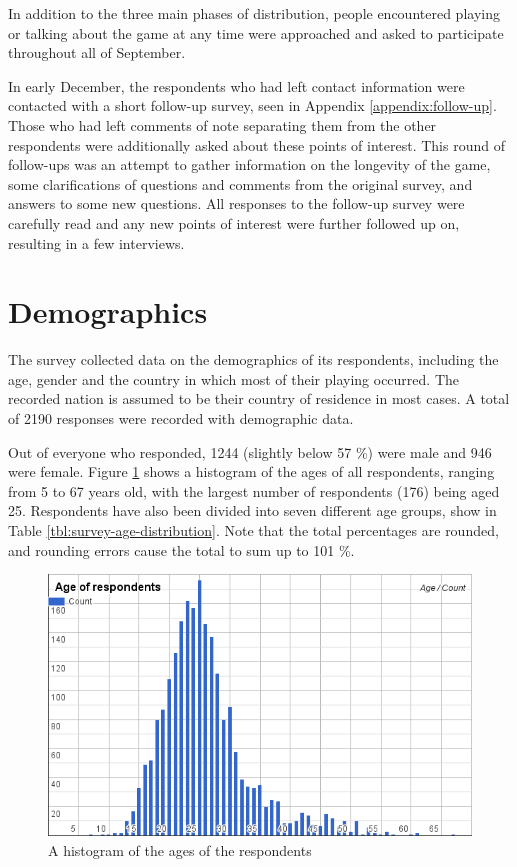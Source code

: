 In addition to the three main phases of distribution, people encountered playing or talking about the game at any time were approached and asked to participate throughout all of September.

In early December, the respondents who had left contact information were contacted with a short follow-up survey, seen in Appendix \ref{appendix:follow-up}. Those who had left comments of note separating them from the other respondents were additionally asked about these points of interest. This round of follow-ups was an attempt to gather information on the longevity of the game, some clarifications of questions and comments from the original survey, and answers to some new questions. All responses to the follow-up survey were carefully read and any new points of interest were further followed up on, resulting in a few interviews.

\section{Demographics}
\label{sec:player-study-demographics}

The survey collected data on the demographics of its respondents, including the age, gender and the country in which most of their playing occurred. The recorded nation is assumed to be their country of residence in most cases. A total of 2190 responses were recorded with demographic data.

Out of everyone who responded, 1244 (slightly below 57 \%) were male and 946 were female. Figure \ref{fig:respondents-age-histogram} shows a histogram of the ages of all respondents, ranging from 5 to 67 years old, with the largest number of respondents (176) being aged 25. Respondents have also been divided into seven different age groups, show in Table \ref{tbl:survey-age-distribution}. Note that the total percentages are rounded, and rounding errors cause the total to sum up to 101 \%.

\begin{figure}[h]
	\centering
	\includegraphics[width=\textwidth]{Figures/age-histogram}
	\caption{A histogram of the ages of the respondents}
	\label{fig:respondents-age-histogram}
\end{figure}

